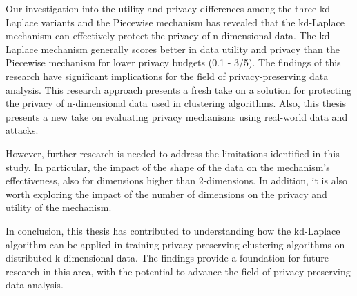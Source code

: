 Our investigation into the utility and privacy differences among the three kd-Laplace variants and the Piecewise mechanism has revealed that the kd-Laplace mechanism can effectively protect the privacy of n-dimensional data.
The kd-Laplace mechanism generally scores better in data utility and privacy than the Piecewise mechanism for lower privacy budgets (0.1 - 3/5).
The findings of this research have significant implications for the field of privacy-preserving data analysis.
This research approach presents a fresh take on a solution for protecting the privacy of n-dimensional data used in clustering algorithms.
Also, this thesis presents a new take on evaluating privacy mechanisms using real-world data and attacks.

However, further research is needed to address the limitations identified in this study.
In particular, the impact of the shape of the data on the mechanism's effectiveness, also for dimensions higher than 2-dimensions.
In addition, it is also worth exploring the impact of the number of dimensions on the privacy and utility of the mechanism.

In conclusion, this thesis has contributed to understanding how the kd-Laplace algorithm can be applied in training privacy-preserving clustering algorithms on distributed k-dimensional data.
The findings provide a foundation for future research in this area, with the potential to advance the field of privacy-preserving data analysis.




